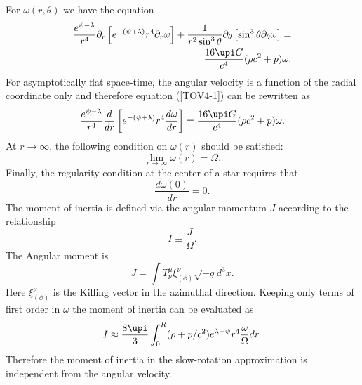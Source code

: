 \documentclass[fleqn,usenatbib]{mnras}
\begin{document}
For $\omega(r,\theta)$ we have the equation
\begin{equation}
    \label{TOV4-1}
    \begin{aligned}
    \frac{e^{\psi-\lambda}}{r^4} \partial_{r}\left[e^{-(\psi +
    \lambda)} r^4 \partial_{r}{\omega} \right]  +
    \frac{1}{r^2\sin^3\theta}
    \partial_{\theta}\left[\sin^3\theta\partial_{\theta}\omega
    \right]= \\
	\frac{16\upi G}{c^4}(\rho c^2 + p){\omega}.
    \end{aligned}
\end{equation}
For asymptotically flat space-time, the angular velocity is a
function of the radial coordinate only and therefore equation
(\ref{TOV4-1}) can be rewritten as
\begin{equation}
    \label{OR}
    \frac{e^{\psi-\lambda}}{r^4} \frac{d}{dr}\left[e^{-(\psi+
    \lambda)}r^4 \frac{d{\omega}}{dr} \right] = \frac{16\upi G}{c^4}
    (\rho c^2 + p){\omega}.
\end{equation}
At $r\rightarrow\infty$, the following condition on $\omega(r)$
should be satisfied:
\begin{equation}
    \lim_{r\to \infty}{\omega(r)}={\Omega}.
\end{equation}
Finally, the regularity condition at the center of a star requires
that
\begin{equation}
    \frac{d{\omega}(0)}{dr}= 0.
\end{equation}
The moment of inertia is defined via the angular momentum  $J$
according to the relationship
\begin{equation}
    I\equiv \frac{J}{\Omega}.
\end{equation}
The Angular moment is
\begin{equation}
    J=\int T^{\mu}_{\nu}\xi^{\nu}_{(\phi)}\sqrt{-g} d^{3}x.
\end{equation}
Here $\xi^{\nu}_{(\phi)}$ is the Killing vector in the azimuthal
direction. Keeping only terms of first order in ${\omega}$ the moment of inertia
can be evaluated as
\begin{equation}\label{Inertial}
    I \approx \frac{8\upi}{3} \int_{0}^{R}(\rho + p/c^2)e^{\lambda - \psi} r^4 \frac{{\omega}}{\Omega} dr .
\end{equation}
Therefore the moment of inertia in the slow-rotation approximation is
independent from the angular velocity.


\bsp    %
\label{lastpage}
\end{document}
